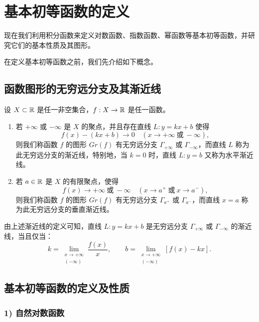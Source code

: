 \section{基本初等函数的定义}

现在我们利用积分函数来定义对数函数、指数函数、幂函数等基本初等函数，并研究它们的基本性质及其图形。

在定义基本初等函数之前，我们先介绍如下概念。

\subsection{函数图形的无穷远分支及其渐近线}

\begin{mydef*}{}

	设 \(X\subset\mathbb{R}\) 是任一非空集合，\(f:X\to\mathbb{R}\) 是任一函数。

	\begin{enumerate}[label=\arabic*)]
		\item 若 \(+\infty\) 或 \(-\infty\) 是 \(X\) 的聚点，并且存在直线 \(L:y=kx+b\) 使得
		\[
		f(x)-(kx+b)\to0\quad(x\to+\infty\ \text{或}\ -\infty),
		\]
		则我们称函数 \(f\) 的图形 \(Gr(f)\) 有无穷远分支 \(\Gamma_{+\infty}\) 或 \(\Gamma_{-\infty}\)，而直线 \(L\) 称为此无穷远分支的渐近线，特别地，当 \(k=0\) 时，直线 \(L:y=b\) 又称为水平渐近线。

		\item 若 \(a\in\mathbb{R}\) 是 \(X\) 的有限聚点，使得
		\[
		f(x)\to+\infty\ \text{或}\ -\infty\quad(x\to a^+\ \text{或}\ x\to a^-),
		\]
		则我们称函数 \(f\) 的图形 \(Gr(f)\) 有无穷远分支 \(\Gamma_{a^+}\) 或 \(\Gamma_{a^-}\)，而直线 \(x=a\) 称为此无穷远分支的垂直渐近线。
	\end{enumerate}

\end{mydef*}

由上述渐近线的定义可知，直线 \(L:y=kx+b\) 是无穷远分支 \(\Gamma_{+\infty}\) 或 \(\Gamma_{-\infty}\) 的渐近线，当且仅当：
\[
k=\lim_{\substack{x\to+\infty\\(-\infty)}}\frac{f(x)}{x},\qquad b=\lim_{\substack{x\to+\infty\\(-\infty)}}[f(x)-kx].
\]

\subsection{基本初等函数的定义及性质}
	\label{sec:5-4-2}

\subsubsection*{1) 自然对数函数}

